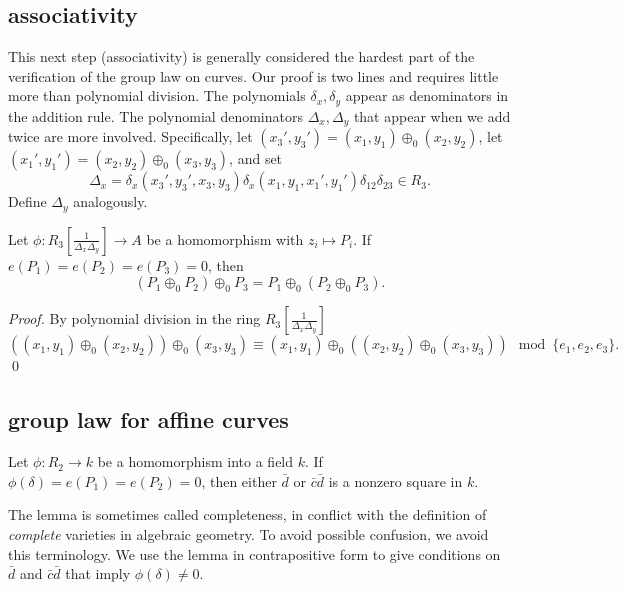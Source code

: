 \documentclass{llncs}
\newcommand{\f}[1]{\frac{1}{#1}}
\begin{document}
\subsection{associativity}\label{sec:assoc}

This next step (associativity) is generally considered the hardest
part of the verification of the group law on curves.  Our proof is two
lines and requires little more than polynomial division.  The
polynomials $\delta_x,\delta_y$ appear as denominators in the addition
rule.  The polynomial denominators $\Delta_x,\Delta_y$ that appear
when we add twice are more involved.  Specifically, let $
(x_3',y_3')=(x_1,y_1) \oplus_0 (x_2,y_2)$, let $(x_1',y_1')=(x_2,y_2)
\oplus_0 (x_3,y_3) $, and set
\[
\Delta_x = \delta_x(x_3',y_3',x_3,y_3)
\delta_x(x_1,y_1,x_1',y_1')\delta_{12}\delta_{23}\in R_3.
\]
Define $\Delta_y$ analogously.

\begin{lemma} \label{lemma:assoc} Let
  $\phi:R_3[\f{\Delta_x\Delta_y}]\to A$ be a homomorphism with
  $z_i\mapsto P_i$.  If $e(P_1)=e(P_2)=e(P_3)=0$, then
\[
(P_1 \oplus_0 P_2)\oplus_0 P_3 = 
P_1 \oplus_0 (P_2\oplus_0 P_3).
\]
\end{lemma}

\begin{proof} By polynomial division in the
  ring $R_3[\f{\Delta_x\Delta_y}]$
\[
((x_1,y_1)\oplus_0 (x_2,y_2)) \oplus_0 (x_3,y_3)\equiv
(x_1,y_1)\oplus_0 ((x_2,y_2) \oplus_0 (x_3,y_3)) \mod \{e_1,e_2,e_3\}.
\]
\qed\end{proof}

\subsection{group law for affine curves}

\begin{lemma} \label{lemma:affine} Let $\phi:R_2\to k$
  be a homomorphism into a field $k$.  If
  $\phi(\delta)=e(P_1)=e(P_2)=0$, then either $\bar d$ or $\bar c \bar
  d$ is a nonzero square in $k$.
\end{lemma}

The lemma is sometimes called completeness, in conflict with the
definition of \emph{complete} varieties in algebraic geometry.  To avoid
possible confusion, we avoid this terminology.  We use the lemma in
contrapositive form to give conditions on $\bar d$ and $\bar c\bar d$
that imply $\phi(\delta)\ne0$.
\end{document}
